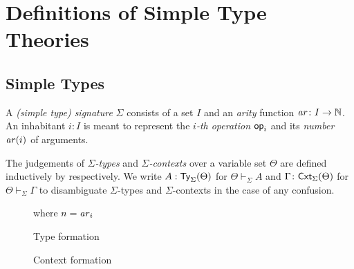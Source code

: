 \documentclass[acmsmall]{acmart}
\theoremstyle{acmdefinition}
\begin{document}
\section{Definitions of Simple Type Theories}\label{sec:simple-type-theories}
\subsection{Simple Types}
\begin{definition}
  A \emph{(simple type) signature} $\Sigma$ consists of a set $I$ and an \emph{arity} function $\mathit{ar}\colon I \to \mathbb{N}$.
  An inhabitant $i : I$ is meant to represent the \emph{$i$-th operation} $\mathsf{op}_i$ and its \emph{number} $ \mathit{ar}(i)$ of arguments.

  The judgements of \emph{$\Sigma$-types} and \emph{$\Sigma$-contexts} over a variable set $\Theta$ are defined inductively by  respectively.
We write $A : \mathsf{Ty}_{\Sigma}(\Theta)$ for $\Theta \vdash_{\Sigma} A$ and $\Gamma \colon \mathsf{Cxt}_{\Sigma}(\Theta)$ for $\Theta \vdash_{\Sigma} \Gamma$ to disambiguate $\Sigma$-types and $\Sigma$-contexts in the case of any confusion.
\end{definition}

\begin{figure}
  \begin{minipage}[b]{.55\textwidth}
    \centering
    \small
    where $n = \mathit{ar}_i$
    \caption{Type formation}
    \label{fig:simple-type}
  \end{minipage}
  \begin{minipage}[b]{.4\textwidth}
    \centering
    \small
    \caption{Context formation}
  \label{fig:simple-context}
  \end{minipage}
\end{figure}
\end{document}
